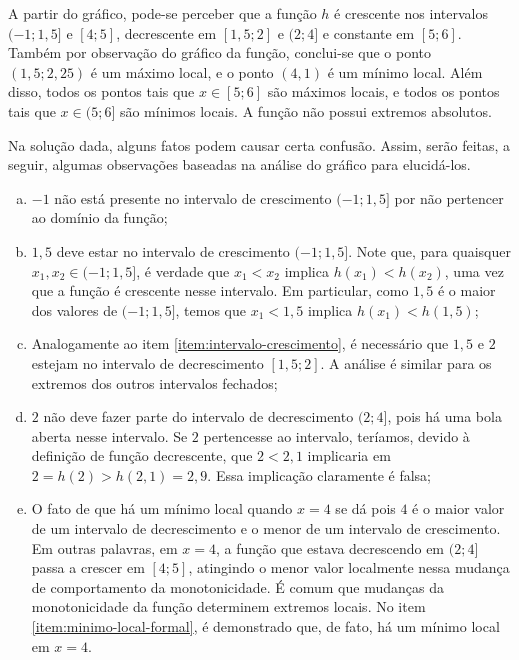 \begin{solution}
	A partir do gráfico, pode-se perceber que a função $h$ é crescente nos intervalos $(-1;1{,}5]$ e $[4;5]$,
	decrescente em $[1,5; 2]$ e $(2;4]$ e constante em $[5;6]$.     
	Também por observação do gráfico da função, conclui-se que o ponto $(1{,}5; 2{,}25)$ é um máximo local,
	e o ponto $(4,1)$ é um mínimo local. 
	Além disso, todos os pontos tais que $x \in [5;6]$ são máximos locais,
	e todos os pontos tais que $x \in (5; 6]$ são mínimos locais.
	A função não possui extremos absolutos.

	Na solução dada, alguns fatos podem causar certa confusão. 
	Assim, serão feitas, a seguir, algumas observações baseadas na análise do gráfico para elucidá-los.
	\begin{enumerate}[(a)]
		\item $-1$ não está presente no intervalo de crescimento $(-1;1{,}5]$ por não pertencer ao domínio da função;
		\item \label{item:intervalo-crescimento} $1{,}5$ deve estar no intervalo de crescimento $(-1;1{,}5]$. 
		Note que, para quaisquer $x_1, x_2 \in (-1;1{,}5]$, é verdade que $x_1 < x_2$ implica $h(x_1) < h(x_2)$,
		uma vez que a função é crescente nesse intervalo. 
		Em particular, como $1{,}5$ é o maior dos valores de $(-1;1{,}5]$, 
		temos que $x_1 < 1{,}5$ implica $h(x_1) < h(1{,}5)$;
		\item Analogamente ao item \ref{item:intervalo-crescimento},
		é necessário que $1{,}5$ e $2$ estejam no intervalo de decrescimento $[1,5; 2]$.
		A análise é similar para os extremos dos outros intervalos fechados;
		\item $2$ não deve fazer parte do intervalo de decrescimento $(2; 4]$, 
		pois há uma bola aberta nesse intervalo. 
		Se $2$ pertencesse ao intervalo, teríamos, devido à definição de função decrescente,
		que $2<2{,}1$ implicaria em $2 = h(2) > h(2{,}1) = 2{,}9$. 
		Essa implicação claramente é falsa;
		\item \label{item:minimo-local} O fato de que há um mínimo local quando $x = 4$ se dá pois $4$ é o maior valor de um intervalo de decrescimento e o menor de um intervalo de crescimento. 
		Em outras palavras, em $x=4$, a função que estava decrescendo em $(2;4]$ passa a crescer em $[4;5]$,
		atingindo o menor valor localmente nessa mudança de comportamento da monotonicidade. 
		É comum que mudanças da monotonicidade da função determinem extremos locais.
		No item \ref{item:minimo-local-formal}, é demonstrado que, de fato, há um mínimo local em $x=4$.

\end{enumerate}
\end{solution}
